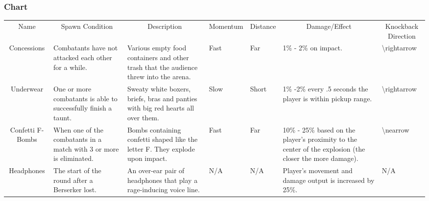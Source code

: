 \subsubsection{Chart}

\begin{table}[h!]
\begin{tabular}{cllllll}
Name             & \multicolumn{1}{c}{Spawn Condition}                                 & \multicolumn{1}{c}{Description}                                                           & \multicolumn{1}{c}{Momentum} & \multicolumn{1}{c}{Distance} & \multicolumn{1}{c}{Damage/Effect}                                                                                                         & \multicolumn{1}{c}{Knockback Direction} \\
Concessions      & Combatants have not attacked each other for a while.                & Various empty food containers and other trash that the audience threw into the arena.     & Fast                         & Far                          & 1\% - 2\% on impact.                                                                                                                      & \textbackslash{}rightarrow              \\
Underwear        & One or more combatants is able to successfully finish a taunt.      & Sweaty white boxers, briefs, bras and panties with big red hearts all over them.          & Slow                         & Short                        & 1\% -2\% every .5 seconds the player is within pickup range.                                                                              & \textbackslash{}rightarrow              \\
Confetti F-Bombs & When one of the combatants in a match with 3 or more is eliminated. & Bombs containing confetti shaped like the letter F. They explode upon impact.             & Fast                         & Far                          & 10\% - 25\% based on the player's proximity to the center of the explosion (the closer the more damage).                                  & \textbackslash{}nearrow                 \\
Headphones       & The start of the round after a Berserker lost.                      & An over-ear pair of headphones that play a rage-inducing voice line.                      & N/A                          & N/A                          & Player's movement and damage output is increased by 25\%.                                                                                 & N/A                                     \\

\end{tabular}
\end{table}
